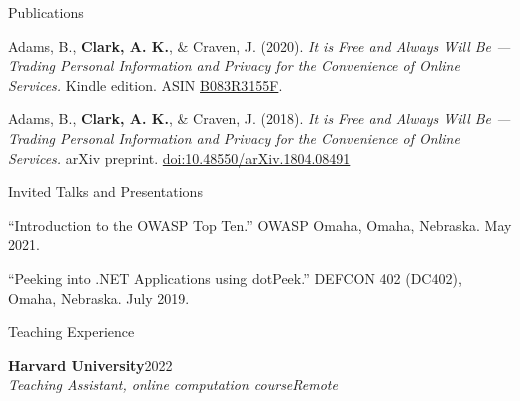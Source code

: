 \documentclass{resume}
\newcommand{\cventry}[4]{%
  {\bf #1}\hfill{#2}\\
  {\em #3}\hfill{\em #4}\par\smallskip
}
\begin{document}
\begin{rSection}{Publications}

Adams, B., \textbf{Clark, A. K.}, \& Craven, J. (2020). \emph{It is Free and Always Will Be ---
Trading Personal Information and Privacy for the Convenience of Online Services.} Kindle edition.
ASIN \href{https://www.amazon.com/dp/B083R3155F}{B083R3155F}.

\smallskip

Adams, B., \textbf{Clark, A. K.}, \& Craven, J. (2018). \emph{It is Free and Always Will Be ---
Trading Personal Information and Privacy for the Convenience of Online Services.} arXiv preprint.
\href{https://doi.org/10.48550/arXiv.1804.08491}{doi:10.48550/arXiv.1804.08491}

\end{rSection}


\begin{rSection}{Invited Talks and Presentations}

``Introduction to the OWASP Top Ten.'' OWASP Omaha, Omaha, Nebraska. May 2021.

\smallskip

``Peeking into .NET Applications using dotPeek.'' DEFCON 402 (DC402), Omaha, Nebraska. July 2019.

\end{rSection}


\begin{rSection}{Teaching Experience}

\cventry{Harvard University}{2022}{Teaching Assistant, online computation course}{Remote}

\end{rSection}

\end{document}
